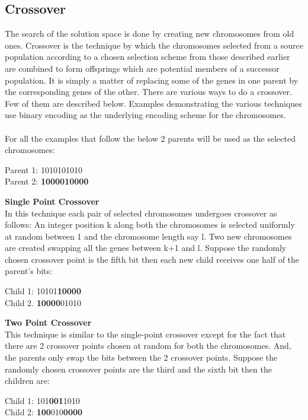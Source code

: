 \documentclass[a4paper, 12pt]{article}
\begin{document}
\subsection{Crossover}
The search of the solution space is done by creating new chromosomes from old ones. Crossover is the technique by which the chromosomes 
selected from a source population according to a chosen selection scheme from those described earlier are combined to form offsprings which are potential members of a successor population. It is simply a matter of replacing some of the genes in one parent by the corresponding genes of the other. There are various ways to do a crossover. Few of them are described below. Examples demonstrating the various techniques use binary encoding as the underlying encoding scheme for the chromosomes.\\~\\
For all the examples that follow the below 2 parents will be used as the selected chromosomes:
\begin{center}
Parent 1: 1010101010\\
 Parent 2: \textbf{1000010000}
\end{center}
\textbf{Single Point Crossover}\\
In this technique each pair of selected chromosomes undergoes crossover as follows: An integer position k along both the chromosomes is 
selected uniformly at random between 1 and the chromosome length say l. Two new chromosomes are created swapping all the genes between k+1 and l. Suppose the randomly chosen crossover point is the fifth bit then each new child receives one half of the parent's bits:
\begin{center}
Child 1: 10101\textbf{10000}\\
Child 2. \textbf{10000}01010
\end{center}
\textbf{Two Point Crossover}\\
This technique is similar to the single-point crossover except for the fact that there are 2 crossover points chosen at random for both the
chromosomes. And, the parents only swap the bits between the 2 crossover points. Suppose the randomly chosen crossover points are the third 
and the sixth bit then the children are:
\begin{center}
Child 1: 101\textbf{001}1010\\
Child 2: \textbf{100}010\textbf{0000}
\end{center}
\end{document}
